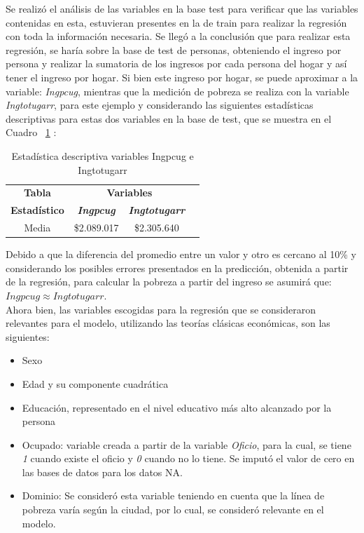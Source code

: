 \documentclass[conference, 10pt]{IEEEtran}
\begin{document}
Se realizó el análisis de las variables en la base test para verificar que las variables contenidas en esta, estuvieran presentes en la de train para realizar la regresión con toda la información necesaria. Se llegó a la conclusión que para realizar esta regresión, se haría sobre la base de test de personas, obteniendo el ingreso por persona y realizar la sumatoria de los ingresos por cada persona del hogar y así tener el ingreso por hogar. Si bien este ingreso por hogar, se puede aproximar a la variable: \textit{Ingpcug}, mientras que la medición de pobreza se realiza con la variable \textit{Ingtotugarr}, para este ejemplo y considerando las siguientes estadísticas descriptivas para estas dos variables en la base de test, que se muestra en el Cuadro ~\ref{tab_1} :

\begin{table}[htbp]
\caption{Estadística descriptiva variables Ingpcug e Ingtotugarr}
\begin{center}
\begin{tabular}{|c|c|c|c|}
\hline
\textbf{Tabla}&\multicolumn{2}{|c|}{\textbf{Variables}} \\
\cline{2-3} 
\textbf{Estadístico} & \textbf{\textit{Ingpcug}}& \textbf{\textit{Ingtotugarr}} \\
\hline
Media& \$2.089.017&\$2.305.640\\
\hline
\end{tabular}
\label{tab_1}
\end{center}
\end{table}

Debido a que la diferencia del promedio entre un valor y otro es cercano al 10\% y considerando los posibles errores presentados en la predicción, obtenida a partir de la regresión, para calcular la pobreza a partir del ingreso se asumirá que: $Ingpcug\approx Ingtotugarr$.\\

Ahora bien, las variables escogidas para la regresión que se consideraron relevantes para el modelo, utilizando las teorías clásicas económicas, son las siguientes:

\begin{itemize}
\item Sexo
\item Edad y su componente cuadrática
\item Educación, representado en el nivel educativo más alto alcanzado por la persona
\item Ocupado: variable creada a partir de la variable \textit{Oficio}, para la cual, se tiene \textit{1} cuando existe el oficio y \textit{0} cuando no lo tiene. Se imputó el valor de cero en las bases de datos para los datos NA.
\item Dominio: Se consideró esta variable teniendo en cuenta que la línea de pobreza varía según la ciudad, por lo cual, se consideró relevante en el modelo.
\end{itemize}
\end{document}
